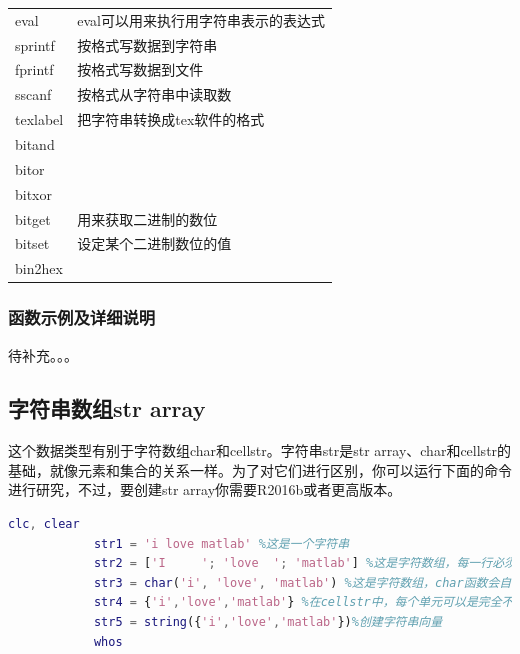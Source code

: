\begin{longtable}{|l|l|}
            \hline
            eval&  eval可以用来执行用字符串表示的表达式\\
            sprintf& 按格式写数据到字符串\\
            fprintf& 按格式写数据到文件\\
            sscanf & 按格式从字符串中读取数\\
            texlabel & 把字符串转换成tex软件的格式\\
            bitand & {}\\
            bitor& {}\\
            bitxor&  {}\\
            bitget & 用来获取二进制的数位\\
            bitset & 设定某个二进制数位的值\\
            bin2hex &{}\\
            \hline
            \end{longtable}
        \subsubsection{函数示例及详细说明}
            \par
            待补充。。。
    \subsection{字符串数组str array}
        \par
        这个数据类型有别于字符数组char和cellstr。字符串str是str array、char和cellstr的基础，就像元素和集合的关系一样。为了对它们进行区别，你可以运行下面的命令进行研究，不过，要创建str array你需要R2016b或者更高版本。
                \begin{lstlisting}[language=Matlab]
            clc, clear
            str1 = 'i love matlab' %这是一个字符串
            str2 = ['I     '; 'love  '; 'matlab'] %这是字符数组，每一行必须具有相同的列数，不够以空格填补
            str3 = char('i', 'love', 'matlab') %这是字符数组，char函数会自动补充空格
            str4 = {'i','love','matlab'} %在cellstr中，每个单元可以是完全不同的内容，所以，不需要补充空格。
            str5 = string({'i','love','matlab'})%创建字符串向量
            whos
                \end{lstlisting}
